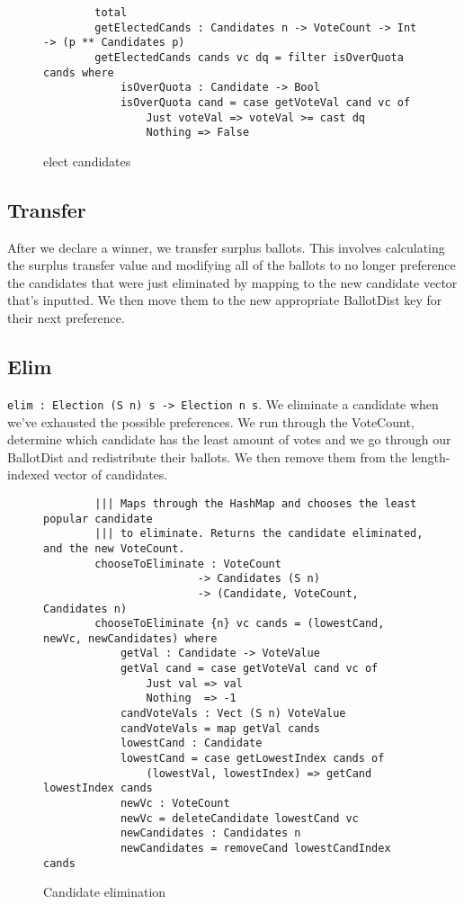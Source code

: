 \begin{figure}[ht!!!!!!!]
    \caption{elect candidates}
    \label{electcands}
    \begin{lstlisting}
        total
        getElectedCands : Candidates n -> VoteCount -> Int -> (p ** Candidates p)
        getElectedCands cands vc dq = filter isOverQuota cands where
            isOverQuota : Candidate -> Bool
            isOverQuota cand = case getVoteVal cand vc of 
                Just voteVal => voteVal >= cast dq
                Nothing => False
    \end{lstlisting}
\end{figure}

\subsection{Transfer}
After we declare a winner, we transfer surplus ballots. This involves
calculating the surplus transfer value and modifying all of the ballots to no
longer preference the candidates that were just eliminated by mapping to the new
candidate vector that's inputted. We then move them to the new appropriate
BallotDist key for their next preference. 

\subsection{Elim}
\texttt{elim : Election (S n) s -> Election n s}. We eliminate a candidate when
we've exhausted the possible preferences. We run through the VoteCount,
determine which candidate has the least amount of votes and we go through our
BallotDist and redistribute their ballots. We then remove them from the
length-indexed vector of candidates. 
\begin{figure}[ht!!!!!!!]
    \caption{Candidate elimination}
    \label{eliminate_idris}
    \begin{lstlisting}
        ||| Maps through the HashMap and chooses the least popular candidate
        ||| to eliminate. Returns the candidate eliminated, and the new VoteCount. 
        chooseToEliminate : VoteCount 
                        -> Candidates (S n) 
                        -> (Candidate, VoteCount, Candidates n)
        chooseToEliminate {n} vc cands = (lowestCand, newVc, newCandidates) where
            getVal : Candidate -> VoteValue
            getVal cand = case getVoteVal cand vc of
                Just val => val
                Nothing  => -1
            candVoteVals : Vect (S n) VoteValue
            candVoteVals = map getVal cands
            lowestCand : Candidate
            lowestCand = case getLowestIndex cands of
                (lowestVal, lowestIndex) => getCand lowestIndex cands
            newVc : VoteCount
            newVc = deleteCandidate lowestCand vc
            newCandidates : Candidates n
            newCandidates = removeCand lowestCandIndex cands
    \end{lstlisting}
\end{figure}

